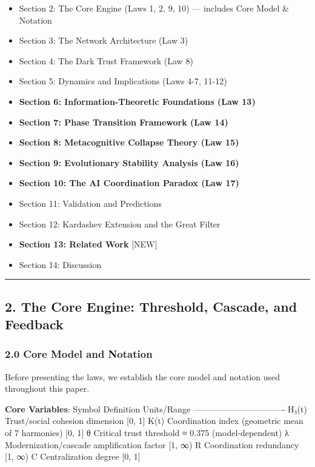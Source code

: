 \documentclass[11pt,letterpaper]{article}
\providecommand{\tightlist}{%
  \setlength{\itemsep}{0pt}\setlength{\parskip}{0pt}}
\begin{document}
\begin{itemize}
\tightlist
\item
  Section 2: The Core Engine (Laws 1, 2, 9, 10) --- includes Core Model
  \& Notation
\item
  Section 3: The Network Architecture (Law 3)
\item
  Section 4: The Dark Trust Framework (Law 8)
\item
  Section 5: Dynamics and Implications (Laws 4-7, 11-12)
\item
  \textbf{Section 6: Information-Theoretic Foundations (Law 13)}
\item
  \textbf{Section 7: Phase Transition Framework (Law 14)}
\item
  \textbf{Section 8: Metacognitive Collapse Theory (Law 15)}
\item
  \textbf{Section 9: Evolutionary Stability Analysis (Law 16)}
\item
  \textbf{Section 10: The AI Coordination Paradox (Law 17)}
\item
  Section 11: Validation and Predictions
\item
  Section 12: Kardashev Extension and the Great Filter
\item
  \textbf{Section 13: Related Work} {[}NEW{]}
\item
  Section 14: Discussion
\end{itemize}

\begin{center}\rule{0.5\linewidth}{0.5pt}\end{center}

\subsection{2. The Core Engine: Threshold, Cascade, and
Feedback}\label{the-core-engine-threshold-cascade-and-feedback}

\subsubsection{2.0 Core Model and
Notation}\label{core-model-and-notation}

Before presenting the laws, we establish the core model and notation
used throughout this paper.

\textbf{Core Variables}: \textbar{} Symbol \textbar{} Definition
\textbar{} Units/Range \textbar{}
\textbar--------\textbar------------\textbar-------------\textbar{}
\textbar{} H₃(t) \textbar{} Trust/social cohesion dimension \textbar{}
{[}0, 1{]} \textbar{} \textbar{} K(t) \textbar{} Coordination index
(geometric mean of 7 harmonies) \textbar{} {[}0, 1{]} \textbar{}
\textbar{} θ \textbar{} Critical trust threshold \textbar{} ≈ 0.375
(model-dependent) \textbar{} \textbar{} λ \textbar{}
Modernization/cascade amplification factor \textbar{} {[}1, ∞)
\textbar{} \textbar{} R \textbar{} Coordination redundancy \textbar{}
{[}1, ∞) \textbar{} \textbar{} C \textbar{} Centralization degree
\textbar{} {[}0, 1{]} \textbar{}
\end{document}
